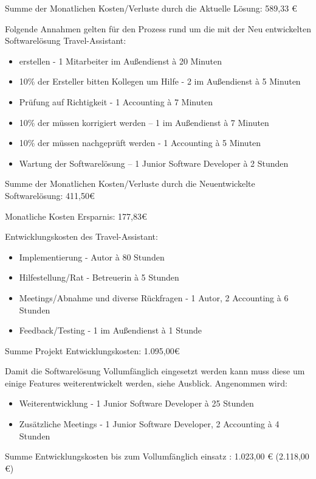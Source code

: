 Summe der Monatlichen Kosten/Verluste durch die Aktuelle Lösung: 589,33 €

Folgende Annahmen gelten für den Prozess rund um die  mit der Neu entwickelten Softwarelösung Travel-Assistant:
\begin{itemize}
\item {} erstellen - 1 Mitarbeiter im Außendienst à 20 Minuten
\item 10\% der Ersteller bitten Kollegen um Hilfe - 2  im Außendienst à 5 Minuten
\item Prüfung auf Richtigkeit - 1  Accounting à 7 Minuten
\item 10\% der  müssen korrigiert werden – 1  im Außendienst à 7 Minuten
\item 10\% der  müssen nachgeprüft werden - 1  Accounting à 5 Minuten
\item Wartung der Softwarelösung – 1 Junior Software Developer à 2 Stunden
\end{itemize}

Summe der Monatlichen Kosten/Verluste durch die Neuentwickelte Softwarelösung: 411,50€

Monatliche Kosten Ersparnis: 177,83€

Entwicklungskosten des Travel-Assistant:
\begin{itemize}

\item Implementierung - Autor à 80 Stunden
\item Hilfestellung/Rat - Betreuerin à 5 Stunden 
\item Meetings/Abnahme und diverse Rückfragen - 1 Autor, 2  Accounting à 6 Stunden
\item Feedback/Testing - 1  im Außendienst à 1 Stunde
\end{itemize}

Summe Projekt Entwicklungskosten: 1.095,00€

Damit die Softwarelösung Vollumfänglich eingesetzt werden kann muss diese um einige Features weiterentwickelt werden, siehe Ausblick. Angenommen wird:
\begin{itemize}
\item Weiterentwicklung - 1 Junior Software Developer à 25 Stunden
\item Zusätzliche Meetings - 1 Junior Software Developer, 2  Accounting à 4 Stunden
\end{itemize}

Summe Entwicklungskosten bis zum Vollumfänglich einsatz : 1.023,00 € (2.118,00 €)


